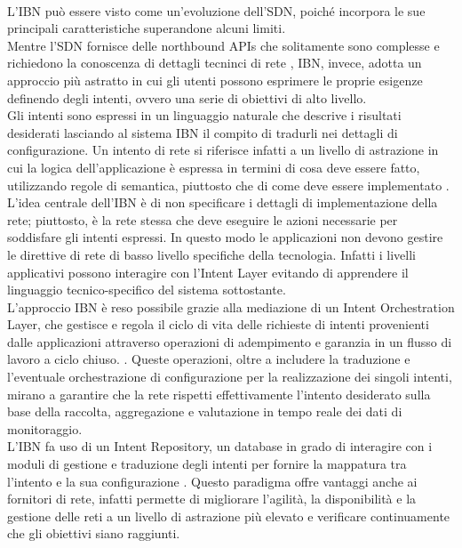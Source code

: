 \\L'IBN può essere visto come un'evoluzione dell'SDN, poiché incorpora le sue principali caratteristiche superandone alcuni limiti.
\\Mentre l'SDN fornisce delle northbound APIs che solitamente sono complesse e richiedono la conoscenza di dettagli tecninci di rete \cite{motivibn},
IBN, invece, adotta un approccio più astratto in cui gli utenti possono esprimere le proprie esigenze definendo degli intenti, ovvero una serie di obiettivi di alto livello.
\\Gli intenti sono espressi in un linguaggio naturale che descrive i risultati desiderati lasciando al sistema IBN il compito di tradurli nei dettagli di configurazione.
Un intento di rete si riferisce infatti a un livello di astrazione in cui la logica dell'applicazione è espressa in termini di cosa deve essere fatto, utilizzando regole di semantica, piuttosto che di come deve essere implementato \cite{ibn2}.
L'idea centrale dell'IBN è di non specificare i dettagli di implementazione della rete; piuttosto, è la rete stessa che deve eseguire le azioni necessarie per soddisfare gli intenti espressi.
In questo modo le applicazioni non devono gestire le direttive di rete di basso livello specifiche della tecnologia. Infatti i livelli applicativi possono interagire con l'Intent Layer evitando di apprendere il linguaggio tecnico-specifico del sistema sottostante.
\\L'approccio IBN è reso possibile grazie alla mediazione di un Intent Orchestration Layer, che gestisce e regola il ciclo di vita delle richieste di intenti provenienti dalle applicazioni attraverso operazioni 
di adempimento e garanzia in un flusso di lavoro a ciclo chiuso. \cite{ibn}.
Queste operazioni, oltre a includere la traduzione e l'eventuale orchestrazione di configurazione per la realizzazione dei singoli intenti, mirano a garantire che la rete rispetti effettivamente l'intento desiderato 
sulla base della raccolta, aggregazione e valutazione in tempo reale dei dati di monitoraggio.
\\L'IBN fa uso di un Intent Repository, un database in grado di interagire con i moduli di gestione e traduzione 
degli intenti per fornire la mappatura tra l'intento e la sua configurazione \cite{ibnrepo}.
Questo paradigma offre vantaggi anche ai fornitori di rete, infatti permette di migliorare l'agilità, la disponibilità
e la gestione delle reti a un livello di astrazione più elevato e verificare continuamente che gli obiettivi siano raggiunti. 

